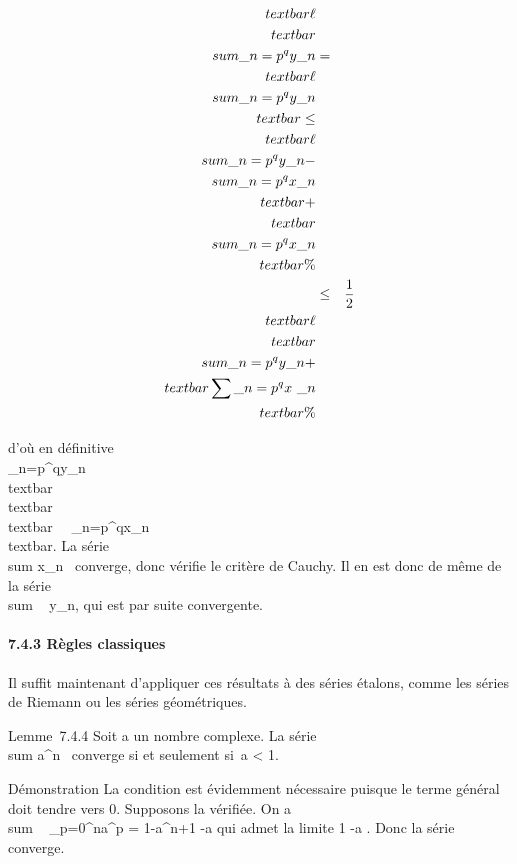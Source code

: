 \documentclass[]{article}
\begin{document}
\begin{align*}
\\textbar{}\ell\\textbar{}\\sum
\_n=p^qy\_ n& =&
\\textbar{}\ell\\sum
\_n=p^qy\_ n\\textbar{}
\leq\\textbar{} \ell\\sum
\_n=p^qy\_ n -\\sum
\_n=p^qx\_ n\\textbar{}
+\\textbar{} \\sum
\_n=p^qx\_ n\\textbar{}\%&
\\ & \leq& 1 \over 2
\\textbar{}\ell\\textbar{}\\sum
\_n=p^qy\_ n +\\textbar{}
\sum \_n=p^qx~\_
n\\textbar{} \%& \\
\end{align*}

d'où en définitive \\\sum
 \_n=p^qy\_n  \over
\\textbar{}\ell\\textbar{}
\\textbar{}\
\sum ~
\_n=p^qx\_n\\textbar{}. La série
\\sum  x\_n~
converge, donc vérifie le critère de Cauchy. Il en est donc de même de
la série \\sum ~
y\_n, qui est par suite convergente.

\paragraph{7.4.3 Règles classiques}

Il suffit maintenant d'appliquer ces résultats à des séries étalons,
comme les séries de Riemann ou les séries géométriques.

Lemme~7.4.4 Soit a un nombre complexe. La série
\\sum  a^n~
converge si et seulement si~\textbar{}a\textbar{} \textless{} 1.

Démonstration La condition est évidemment nécessaire puisque le terme
général doit tendre vers 0. Supposons la vérifiée. On a
\\sum ~
\_p=0^na^p = 1-a^n+1
-a qui admet la limite  1 \over
1-a . Donc la série converge.
\end{document}
